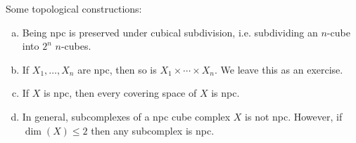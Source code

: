 \documentclass{article}
\begin{document}
Some topological constructions:
\begin{enumerate}[(a)]
    \item Being npc is preserved under cubical subdivision, i.e. subdividing an \(n\)-cube into \(2^n\) \(n\)-cubes.
    \item If \(X_1, \dots, X_n\) are npc, then so is \(X_1 \times \cdots \times X_n\). We leave this as an exercise.
    \item If \(X\) is npc, then every covering space of \(X\) is npc.
    \item In general, subcomplexes of a npc cube complex \(X\) is not npc. However, if \(\dim(X) \le 2\) then any subcomplex is npc.
\end{enumerate}
\end{document}
